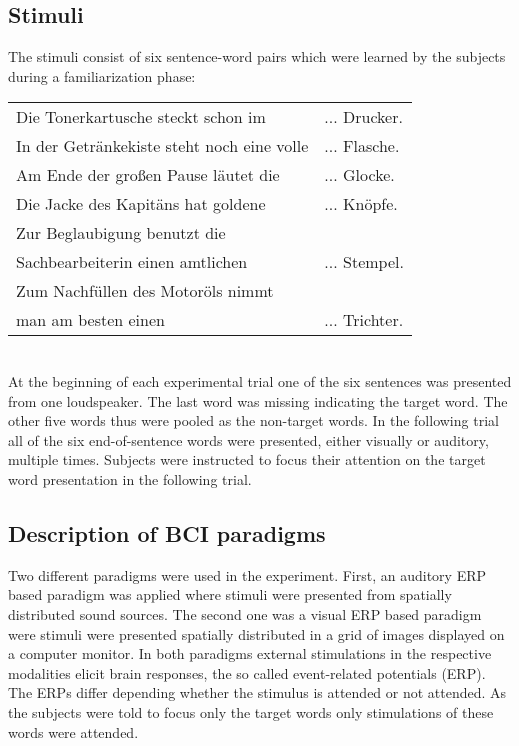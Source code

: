 \documentclass[10pt,letterpaper]{article}
\begin{document}
\subsection{Stimuli}
The stimuli consist of six sentence-word pairs which were learned by the subjects during a familiarization phase:
\\

\begin{tabular}[t]{ll}
Die Tonerkartusche steckt schon im 	& ... Drucker.\\
In der Getr\"ankekiste steht noch eine volle & ... Flasche.\\
Am Ende der großen Pause l\"autet die & ... Glocke.\\
Die Jacke des Kapit\"ans hat goldene & ... Kn\"opfe.\\
Zur Beglaubigung benutzt die \\
Sachbearbeiterin einen amtlichen	& ... Stempel.\\
Zum Nachf\"ullen des Motor\"ols nimmt\\
man am besten einen & ... Trichter.\\
\end{tabular}
\\

At the beginning of each experimental trial one of the six sentences was presented from one loudspeaker.
The last word was missing indicating the target word.
The other five words thus were pooled as the non-target words.
In the following trial all of the six end-of-sentence words were presented, either visually or auditory, multiple times.
Subjects were instructed to focus their attention on the target word presentation in the following trial.

\subsection{Description of BCI paradigms}
Two different paradigms were used in the experiment.
First, an auditory ERP based paradigm was applied where stimuli were presented from spatially distributed sound sources.
The second one was a visual ERP based paradigm were stimuli were presented spatially distributed in a grid of images displayed on a computer monitor. 
In both paradigms external stimulations in the respective modalities elicit brain responses, the so called event-related potentials (ERP).
The ERPs differ depending whether the stimulus is attended or not attended.
As the subjects were told to focus only the target words only stimulations of these words were attended.
\end{document}
